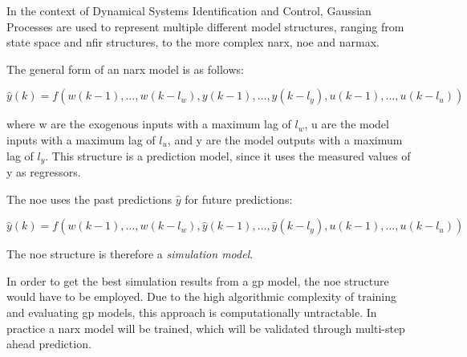 In the context of Dynamical Systems Identification and Control, Gaussian
Processes are used to represent multiple different model structures, ranging
from state space and \acrshort{nfir} structures, to the more complex
\acrshort{narx}, \acrshort{noe} and \acrshort{narmax}. 


The general form of an \acrfull{narx} model is as follows:

\begin{equation}
    \hat{y}(k) =
    f(w(k-1),\dots,w(k-l_w),y(k-1),\dots,y(k-l_y),u(k-1),\dots,u(k-l_u))
\end{equation}

where w are the exogenous inputs with a maximum lag of $l_w$, u are the model
inputs with a maximum lag of $l_u$, and y are the model outputs with a maximum
lag of $l_y$. This structure is a prediction model, since it uses the measured
values of y as regressors.

The \acrfull{noe} uses the past predictions $\hat{y}$ for future predictions:

\begin{equation}
    \hat{y}(k) =
    f(w(k-1),\dots,w(k-l_w),\hat{y}(k-1),\dots,\hat{y}(k-l_y),u(k-1),\dots,u(k-l_u))
\end{equation}

The \acrshort{noe} structure is therefore a \textit{simulation model}.

In order to get the best simulation results from a \acrshort{gp} model, the
\acrshort{noe} structure would have to be employed. Due to the high algorithmic
complexity of training and evaluating \acrshort{gp} models, this approach is
computationally untractable. In practice a \acrshort{narx} model will be trained,
which will be validated through multi-step ahead prediction.

\clearpage
